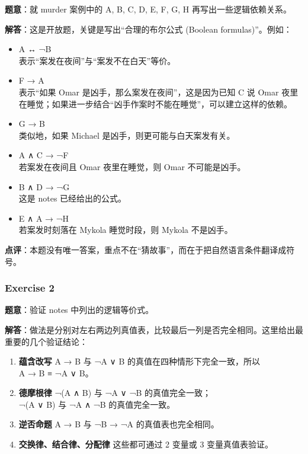 \documentclass[
  11pt,
]{article}
\providecommand{\tightlist}{%
  \setlength{\itemsep}{0pt}\setlength{\parskip}{0pt}}
\begin{document}
\textbf{题意}：就 murder 案例中的 A, B, C, D, E, F, G, H
再写出一些逻辑依赖关系。

\textbf{解答}：这是开放题，关键是写出``合理的布尔公式 (Boolean
formulas)''。例如：

\begin{itemize}
\tightlist
\item
  A ↔ ¬B\\
  表示``案发在夜间''与``案发不在白天''等价。
\item
  F → A\\
  表示``如果 Omar 是凶手，那么案发在夜间''，这是因为已知 C 说 Omar
  夜里在睡觉；如果进一步结合``凶手作案时不能在睡觉''，可以建立这样的依赖。
\item
  G → B\\
  类似地，如果 Michael 是凶手，则更可能与白天案发有关。
\item
  A ∧ C → ¬F\\
  若案发在夜间且 Omar 夜里在睡觉，则 Omar 不可能是凶手。
\item
  B ∧ D → ¬G\\
  这是 notes 已经给出的公式。
\item
  E ∧ A → ¬H\\
  若案发时刻落在 Mykola 睡觉时段，则 Mykola 不是凶手。
\end{itemize}

\textbf{点评}：本题没有唯一答案，重点不在``猜故事''，而在于把自然语言条件翻译成符号。

\subsubsection{Exercise 2}\label{exercise-2}

\textbf{题意}：验证 notes 中列出的逻辑等价式。

\textbf{解答}：做法是分别对左右两边列真值表，比较最后一列是否完全相同。这里给出最重要的几个验证结论：

\begin{enumerate}
\def\labelenumi{\arabic{enumi}.}
\item
  \textbf{蕴含改写} A → B 与 ¬A ∨ B 的真值在四种情形下完全一致，所以\\
  A → B ≡ ¬A ∨ B。
\item
  \textbf{德摩根律} ¬(A ∧ B) 与 ¬A ∨ ¬B 的真值完全一致；\\
  ¬(A ∨ B) 与 ¬A ∧ ¬B 的真值完全一致。
\item
  \textbf{逆否命题} A → B 与 ¬B → ¬A 的真值表也完全相同。
\item
  \textbf{交换律、结合律、分配律} 这些都可通过 2 变量或 3
  变量真值表验证。
\end{enumerate}
\end{document}
